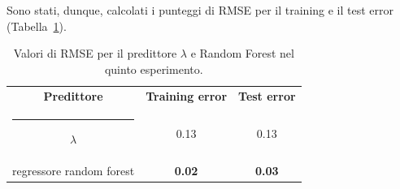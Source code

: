 \documentclass[12pt]{report}
\makeatletter
\theoremstyle{definition}
\newcommand{\thickhline}{%
    \noalign {\ifnum 0=`}\fi \hrule height 1pt
    \futurelet \reserved@a \@xhline
}
\makeatother
\begin{document}
Sono stati, dunque, calcolati i punteggi di RMSE per il training e il test error (Tabella~\ref{rmse_exp5}). 
\begin{table}
\centering
\begin{adjustbox}{max width=\textwidth}
 \begin{tabular}{|c|c|c|} 
 \hline
\textbf{Predittore} & \textbf{Training error} & \textbf{Test error}
\\ [0.5ex] 
 \thickhline
 $\lambda$ & 0.13 & 0.13 \\
 regressore random forest & \textbf{0.02} & \textbf{0.03}
 \\
 \hline
\end{tabular}
\end{adjustbox}
\caption{Valori di RMSE per il predittore $\lambda$ e Random Forest nel quinto esperimento.}
\label{rmse_exp5}
\end{table}
\end{document}

